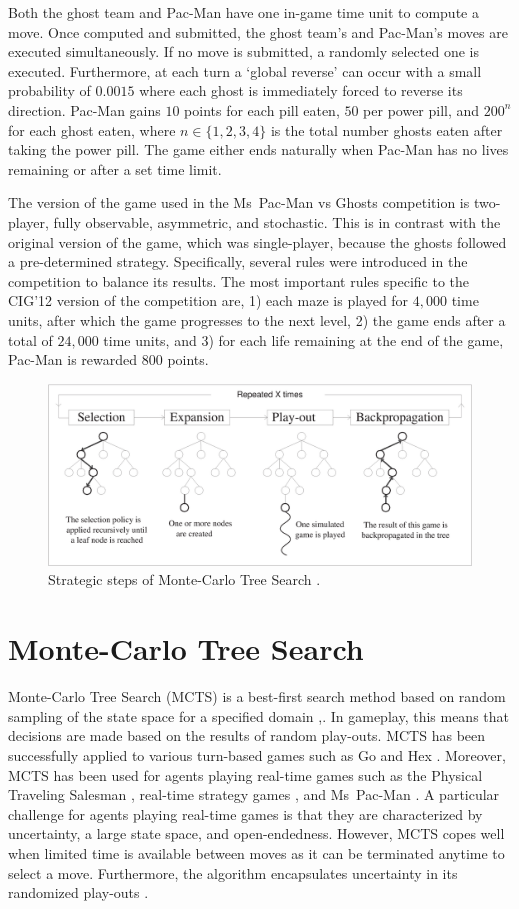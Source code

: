 \documentclass[journal]{IEEEtran}
\begin{document}
Both the ghost team and Pac-Man have one in-game time unit to compute a move. Once computed and submitted, the ghost team's and Pac-Man's moves are executed simultaneously. If no move is submitted, a randomly selected one is executed. Furthermore, at each turn a `global reverse' can occur with a small probability of $0.0015$ where each ghost is immediately forced to reverse its direction. Pac-Man gains $10$ points for each pill eaten, $50$ per power pill, and $200^n$ for each ghost eaten, where $n\in \{ 1, 2 , 3, 4 \}$ is the total number ghosts eaten after taking the power pill. The game either ends naturally when Pac-Man has no lives remaining or after a set time limit.

The version of the game used in the Ms~Pac-Man vs Ghosts competition is two-player, fully observable, asymmetric, and stochastic. This is in contrast with the original version of the game, which was single-player, because the ghosts followed a pre-determined strategy. Specifically, several rules were introduced in the competition to balance its results. The most important rules specific to the CIG'12 version of the competition are, 1) each maze is played for $4,000$ time units, after which the game progresses to the next level, 2) the game ends after a total of $24,000$ time units, and 3) for each life remaining at the end of the game, Pac-Man is rewarded $800$ points. 

\begin{figure}[ht]
	\centering
	\includegraphics[width=.5\textwidth]{img/figure1.eps}
	\caption{Strategic steps of Monte-Carlo Tree Search \cite{chaslot2008progressive}.}
	\label{fig:mcts-algorithm}
\end{figure}
\section{Monte-Carlo Tree Search}
\label{MCTS}
Monte-Carlo Tree Search (MCTS) is a best-first search method based on random sampling of the state space for a specified domain \cite{kocsis2006bandit},\cite{coulom2007efficient}. In gameplay, this means that decisions are made based on the results of random play-outs. MCTS has been successfully applied to various turn-based games such as Go \cite{lee2010current} and Hex \cite{arneson2010monte}. Moreover, MCTS has been used for agents playing real-time games such as the Physical Traveling Salesman  \cite{powleytsp}, real-time strategy games \cite{balla2009uct}, and Ms~Pac-Man \cite{ikehata2011monte}. A particular challenge for agents playing real-time games is that they are  characterized by uncertainty, a large state space, and open-endedness. However, MCTS copes well when limited time is available between moves as it can be terminated anytime to select a move. Furthermore, the algorithm encapsulates uncertainty in its randomized play-outs \cite{brownesurvey}.
\end{document}
